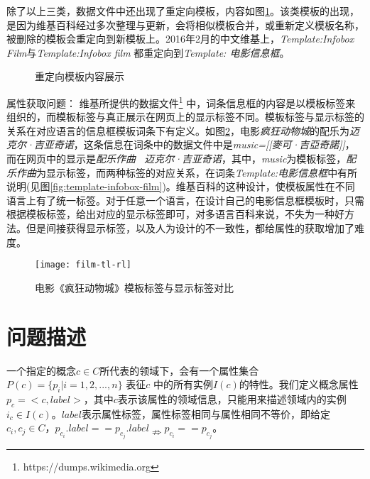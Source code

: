 除了以上三类，数据文件中还出现了{\heiti 重定向模板}，内容如图\ref{fig:template-redirect}。该类模板的出现，是因为维基百科经过多次整理与更新，会将相似模板合并，或重新定义模板名称，被删除的模板会重定向到新模板上。2016年2月的中文维基上，\textit{Template:Infobox Film}与\textit{Template:Infobox film} 都重定向到\textit{Template: 电影信息框}。

\begin{figure}[ht]
  \centering
  \caption{重定向模板内容展示}
  \label{fig:template-redirect}
\end{figure}

{\heiti 属性获取问题：}
维基所提供的数据文件\footnote{https://dumps.wikimedia.org} 中，词条信息框的内容是以{\heiti 模板标签}来组织的，而模板标签与真正展示在网页上的{\heiti 显示标签}不同。模板标签与显示标签的关系在对应语言的信息框模板词条下有定义。如图\ref{fig:film-tl-rl}，电影\textit{疯狂动物城}的配乐为\textit{迈克尔·吉亚奇诺}，这条信息在词条中的数据文件中是\textit{music=[[麥可·吉亞奇諾]]}，而在网页中的显示是\textit{配乐作曲 \ 迈克尔·吉亚奇诺}，其中，\textit{music}为模板标签，\textit{配乐作曲}为显示标签，而两种标签的对应关系，在词条\textit{Template:电影信息框}中有所说明(见图\ref{fig:template-infobox-film})。维基百科的这种设计，使模板属性在不同语言上有了统一标签。对于任意一个语言，在设计自己的电影信息框模板时，只需根据模板标签，给出对应的显示标签即可，对多语言百科来说，不失为一种好方法。但是间接获得显示标签，以及人为设计的不一致性，都给属性的获取增加了难度。

\begin{figure}[ht]
  \centering
  \texttt{[image: film-tl-rl]}
  \caption{电影《疯狂动物城》模板标签与显示标签对比}
  \label{fig:film-tl-rl}
\end{figure}

\section{问题描述}

一个指定的概念$c \in C$所代表的领域下，会有一个属性集合$P(c)=\{p_{i}|i=1,2,...,n\}$ 表征$c$ 中的所有实例$I(c)$的特性。我们定义概念属性$p_{c}= <c, label>$，其中$c$表示该属性的领域信息，只能用来描述领域内的实例$i_{c} \in I(c)$。$label$表示属性标签，属性标签相同与属性相同不等价，即给定$c_i,c_j \in C$，$p_{c_i}.label == p_{c_j}.label\nRightarrow p_{c_i} == p_{c_j}$。

